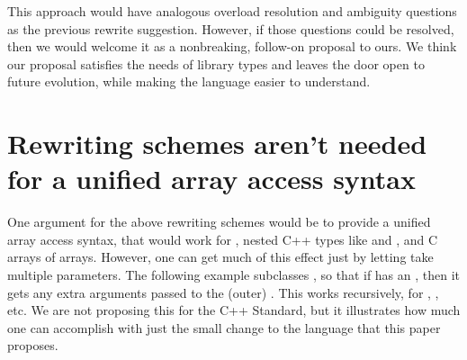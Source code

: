 \documentclass{wg21}
\begin{document}
This approach would have analogous overload resolution and ambiguity questions as the previous rewrite suggestion.  However, if those questions could be resolved, then we would welcome it as a nonbreaking, follow-on proposal to ours.  We think our proposal satisfies the needs of library types and leaves the door open to future evolution, while making the language easier to understand.

\section{Rewriting schemes aren't needed for a unified array access syntax}

One argument for the above rewriting schemes would be to provide a unified array access syntax, that would work for , nested C++ types like  and , and C arrays of arrays.  However, one can get much of this effect just by letting  take multiple parameters.  The following example subclasses , so that if  has an , then it gets any extra arguments passed to the (outer) .  This works recursively, for , , etc.  We are not proposing this for the C++ Standard, but it illustrates how much one can accomplish with just the small change to the language that this paper proposes.
\end{document}
